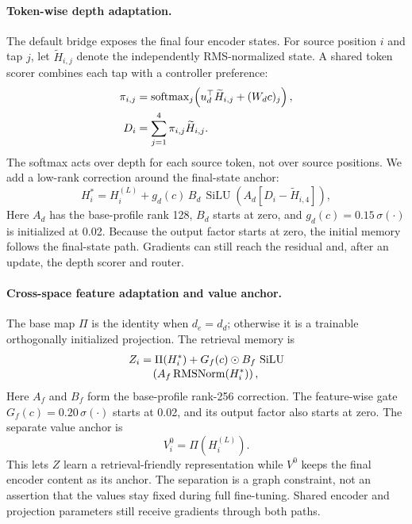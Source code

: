 \paragraph{Token-wise depth adaptation.}
The default bridge exposes the final four encoder states.  For source position
$i$ and tap $j$, let $\widetilde H_{i,j}$ denote the independently
RMS-normalized state.  A shared token scorer combines each tap with a
controller preference:
\begin{equation}
  \begin{aligned}
    \pi_{i,j}&=\operatorname{softmax}_j\!\left(u_d^{\top}\widetilde H_{i,j}+(W_dc)_j\right),\\
    D_i&=\sum_{j=1}^{4}\pi_{i,j}\widetilde H_{i,j}.
  \end{aligned}
  \label{eq:depth}
\end{equation}
The softmax acts over depth for each source token, not over source positions.
We add a low-rank correction around the final-state anchor:
\begin{equation}
  H_i^*=H_i^{(L)}+g_d(c)\,B_d\,\operatorname{SiLU}\!\left(A_d
  [D_i-\widetilde H_{i,4}]\right),
  \label{eq:depth-residual}
\end{equation}
Here $A_d$ has the base-profile rank 128, $B_d$ starts at zero, and
$g_d(c)=0.15\,\sigma(\cdot)$ is initialized at 0.02.  Because the output factor
starts at zero, the initial memory follows the final-state path.  Gradients can
still reach the residual and, after an update, the depth scorer and router.

\paragraph{Cross-space feature adaptation and value anchor.}
The base map $\Pi$ is the identity when $d_e=d_d$; otherwise it is a trainable
orthogonally initialized projection.  The retrieval memory is
\begin{equation}
  \begin{aligned}
    Z_i&=\Pi(H_i^*)+G_f(c)\odot B_f\,\operatorname{SiLU}\\[-2pt]
       &\quad\left(A_f\operatorname{RMSNorm}(H_i^*)\right),
  \end{aligned}
  \label{eq:feature}
\end{equation}
Here $A_f$ and $B_f$ form the base-profile rank-256 correction.  The
feature-wise gate $G_f(c)=0.20\,\sigma(\cdot)$ starts at 0.02, and its output
factor also starts at zero.  The separate value anchor is
\begin{equation}
  V_i^0=\Pi(H_i^{(L)}).
  \label{eq:value-anchor}
\end{equation}
This lets $Z$ learn a retrieval-friendly representation while $V^0$ keeps the
final encoder content as its anchor.  The separation is a graph constraint, not
an assertion that the values stay fixed during full fine-tuning.  Shared encoder
and projection parameters still receive gradients through both paths.

